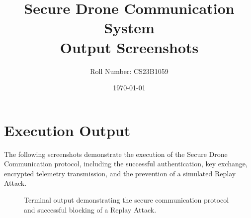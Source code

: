 \documentclass[12pt,a4paper]{article}
\title{\textbf{Secure Drone Communication System}\\ \large Output Screenshots}
\author{Roll Number: CS23B1059}
\date{\today}
\begin{document}
\maketitle

\section*{Execution Output}

The following screenshots demonstrate the execution of the Secure Drone Communication protocol, including the successful authentication, key exchange, encrypted telemetry transmission, and the prevention of a simulated Replay Attack.

\vspace{1cm}


\begin{figure}[h!]
    \centering
    \caption{Terminal output demonstrating the secure communication protocol and successful blocking of a Replay Attack.}
    \label{fig:output}
\end{figure}
\end{document}
